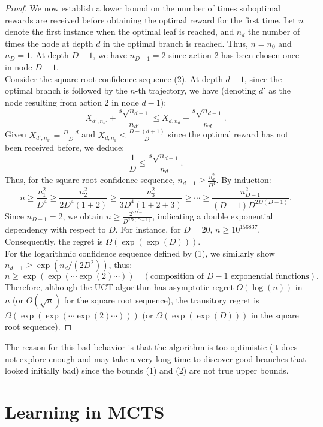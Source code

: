 \documentclass[11pt]{article}
\theoremstyle{definitionstyle}
\begin{document}
\begin{proof}
We now establish a lower bound on the number of times suboptimal rewards are received before obtaining the optimal reward for the first time. Let \(n\) denote the first instance when the optimal leaf is reached, and \(n_d\) the number of times the node at depth \(d\) in the optimal branch is reached. Thus, \(n = n_0\) and \(n_D = 1\). At depth \(D - 1\), we have \(n_{D-1} = 2\) since action 2 has been chosen once in node \(D - 1\).\\

Consider the square root confidence sequence (2). At depth \(d - 1\), since the optimal branch is followed by the \(n\)-th trajectory, we have (denoting \(d'\) as the node resulting from action 2 in node \(d - 1\)):
\[ 
X_{d',n_{d'}} + \frac{s\sqrt{n_{d-1}}}{n_{d'}} \leq X_{d,n_d} + \frac{s\sqrt{n_{d-1}}}{n_d}.
\]
Given \(X_{d',n_{d'}} = \frac{D - d}{D}\) and \(X_{d,n_d} \leq \frac{D - (d + 1)}{D}\) since the optimal reward has not been received before, we deduce:
\[ 
\frac{1}{D} \leq \frac{s\sqrt{n_{d-1}}}{n_d}.
\]
Thus, for the square root confidence sequence, \(n_{d-1} \geq \frac{n_d^2}{D^4}\). By induction:
\[ 
n \geq \frac{n_1^2}{D^4} \geq \frac{n_2^2}{2D^4(1+2)} \geq \frac{n_3^2}{3D^4(1+2+3)} \geq \cdots \geq \frac{n_{D-1}^2}{(D-1)D^{2D(D-1)}}.
\]
Since \(n_{D-1} = 2\), we obtain \(n \geq \frac{2^{2D-1}}{D^{2D(D-1)}}\), indicating a double exponential dependency with respect to \(D\). For instance, for \(D = 20\), \(n \geq 10^{156837}\). Consequently, the regret is \(\Omega(\exp(\exp(D)))\).\\

For the logarithmic confidence sequence defined by (1), we similarly show \(n_{d-1} \geq \exp(n_d/(2D^2))\), thus:
\[ 
n \geq \exp(\exp(\cdots \exp(2) \cdots)) \quad (\text{composition of } D - 1 \text{ exponential functions}).
\]
Therefore, although the UCT algorithm has asymptotic regret \(O(\log(n))\) in \(n\) (or \(O(\sqrt{n})\) for the square root sequence), the transitory regret is \(\Omega(\exp(\exp(\cdots \exp(2) \cdots)))\) (or \(\Omega(\exp(\exp(D)))\) in the square root sequence).
\end{proof}
The reason for this bad behavior is that the algorithm is too optimistic (it does not explore enough and may take a very long time to discover good branches that looked initially bad) since the bounds (1) and (2) are not true upper bounds.\\
\section{Learning in MCTS}
\end{document}
